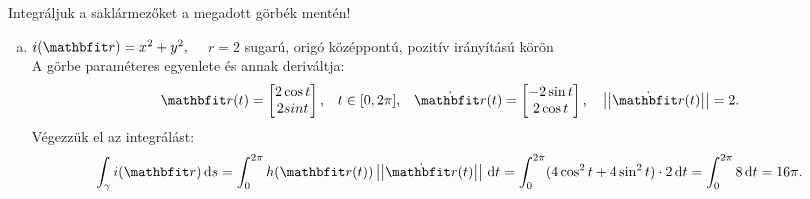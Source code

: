 \documentclass[exercise]{math-standalone}
\begin{document}
\begin{exercise}{Integráljuk a saklármezőket a megadott görbék mentén!}
{\begin{enumerate}[a)]
      \item $i(\rvec r) = x^2 + y^2, \quad$ $r = 2$ sugarú, origó középpontú, pozitív irányítású körön\\[3mm]
            A görbe paraméteres egyenlete és annak deriváltja:
            \[
              \rvec r(t) = \begin{bmatrix}
                2 \cos t \\ 2 sin t
              \end{bmatrix}
              \text, \quad
              t \in [0, 2 \pi]
              \text, \quad
              \dot{\rvec r}(t) = \begin{bmatrix}
                -2 \sin t \\ 2 \cos t
              \end{bmatrix}
              \text, \quad
              \norma{\dot{\rvec r}(t)}
              = 2
              \text.
            \]
            Végezzük el az integrálást:
            \[
              \int_\gamma i(\rvec r) \, \diff s
              = \int_0^{2\pi} h(\rvec r(t)) \norma{\dot{\rvec r}(t)} \, \diff t
              = \int_0^{2\pi} (4 \cos^2 t + 4 \sin^2 t) \cdot 2 \, \diff t
              = \int_0^{2\pi} 8 \, \diff t
              = 16 \pi
              \text.
            \]
    \end{enumerate}
  }
\end{exercise}
\end{document}
